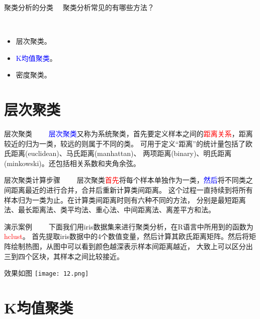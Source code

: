 \documentclass[cjk]{beamer}
\begin{document}
\begin{CJK*}{GBK}{kai}
\begin{frame}{聚类分析的分类}
\
{\bf{\color{red!75!black}{\large Q:}}}\ 聚类分析常见的有哪些方法？

\

\begin{itemize}
  \item 层次聚类。
  \item \textcolor{blue}{K均值聚类}。
  \item 密度聚类。
\end{itemize}

\end{frame}




\section{层次聚类}
\begin{frame}{层次聚类}
\ \ \ \ \textcolor{blue}{层次聚类}又称为系统聚类，首先要定义样本之间的\textcolor{red}{距离关系}，距离较近的归为一类，较远的则属于不同的类。
可用于定义“距离”的统计量包括了欧氏距离(euclidean)、马氏距离(manhattan)、
两项距离(binary)、明氏距离(minkowski)。还包括相关系数和夹角余弦。
\end{frame}
\begin{frame}{层次聚类计算步骤}
\ \ \ \ 层次聚类\textcolor{red}{首先}将每个样本单独作为一类，\textcolor{blue}{然后}将不同类之间距离最近的进行合并，合并后重新计算类间距离。
这个过程一直持续到将所有样本归为一类为止。在计算类间距离时则有六种不同的方法，
分别是最短距离法、最长距离法、类平均法、重心法、中间距离法、离差平方和法。
\end{frame}

\begin{frame}{演示案例}
\ \ \ \ 下面我们用iris数据集来进行聚类分析，在R语言中所用到的函数为\textcolor{red}{hclust}。
首先提取iris数据中的4个数值变量，然后计算其欧氏距离矩阵。然后将矩阵绘制热图，从图中可以看到颜色越深表示样本间距离越近，
大致上可以区分出三到四个区块，其样本之间比较接近。

\end{frame}


\begin{frame}{效果如图}
\centering
\texttt{[image: 12.png]}
\end{frame}

\section{K均值聚类}


\end{CJK*}
\end{document}

